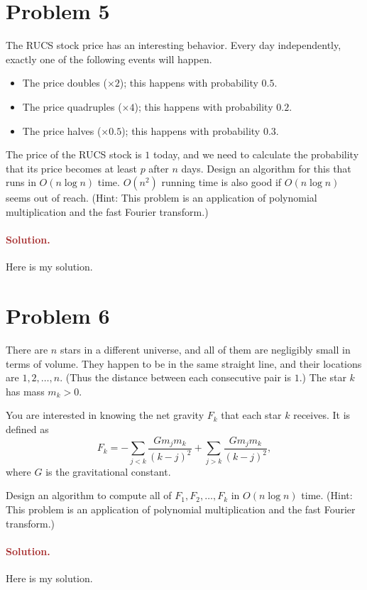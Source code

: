 \section*{Problem 5}
The RUCS stock price has an interesting behavior. Every day independently, exactly one of the following events will happen.
\begin{itemize}
    \item The price doubles ($\times 2$); this happens with probability $0.5$.
    \item The price quadruples ($\times 4$); this happens with probability $0.2$.
    \item The price halves ($\times 0.5$); this happens with probability $0.3$.
\end{itemize}

The price of the RUCS stock is $1$ today, and we need to calculate the probability that its price becomes at least $p$ after $n$ days. Design an algorithm for this that runs in $O(n \log n)$ time. $O(n^2)$ running time is also good if $O(n \log n)$ seems out of reach. (Hint: This problem is an application of polynomial multiplication and the fast Fourier transform.)

\paragraph{\textcolor{brown}{Solution.}}
Here is my solution.

\section*{Problem 6}
There are $n$ stars in a different universe, and all of them are negligibly small in terms of volume. They happen to be in the same straight line, and their locations are $1, 2, \ldots, n$. (Thus the distance between each consecutive pair is $1$.) The star $k$ has mass $m_k > 0$.

You are interested in knowing the net gravity $F_k$ that each star $k$ receives. It is defined as
\[
F_k = -\sum_{j < k} \frac{G m_j m_k}{(k - j)^2} + \sum_{j > k} \frac{G m_j m_k}{(k - j)^2},
\]
where $G$ is the gravitational constant.

Design an algorithm to compute all of $F_1, F_2, \ldots, F_k$ in $O(n \log n)$ time. (Hint: This problem is an application of polynomial multiplication and the fast Fourier transform.)

\paragraph{\textcolor{brown}{Solution.}}
Here is my solution.
